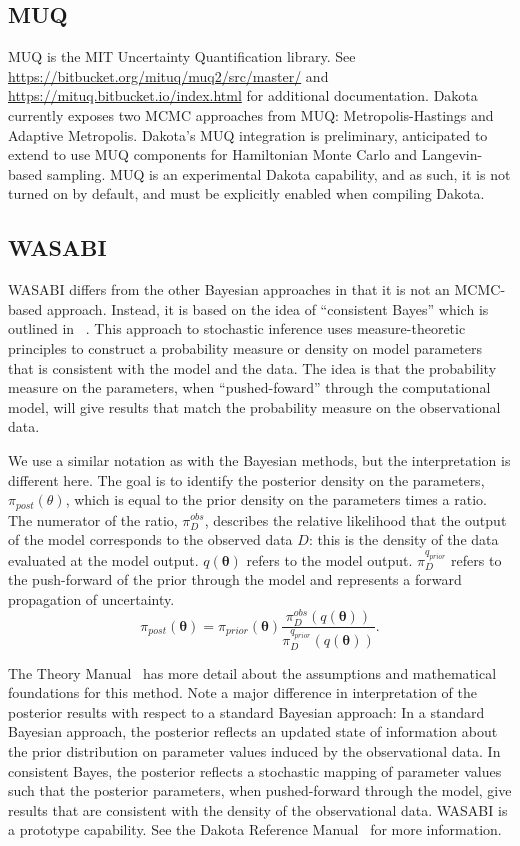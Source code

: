 \subsection{MUQ}
MUQ is the MIT Uncertainty Quantification library.  See
\url{https://bitbucket.org/mituq/muq2/src/master/} and
\url{https://mituq.bitbucket.io/index.html} for additional
documentation.  Dakota currently exposes two MCMC approaches from MUQ:
Metropolis-Hastings and Adaptive Metropolis. Dakota's MUQ integration
is preliminary, anticipated to extend to use MUQ components for
Hamiltonian Monte Carlo and Langevin-based sampling.  MUQ is an
experimental Dakota capability, and as such, it is not turned on by
default, and must be explicitly enabled when compiling Dakota.

\subsection{WASABI}
WASABI differs from the other Bayesian approaches in that it is 
not an MCMC-based approach.  Instead, it is based on the idea of 
``consistent Bayes'' which is outlined in ~\cite{Butler2017}.
This approach to stochastic inference uses measure-theoretic 
principles to construct a probability measure or density on model parameters
that is consistent with the model and the data.  The idea is that
the probability measure on the parameters, when ``pushed-foward'' through
the computational model, will give results that match the probability 
measure on the observational data.  

We use a similar notation as with the Bayesian methods, but the interpretation 
is different here.  The goal is to identify the posterior density on the 
parameters, $\pi_{post}({\theta})$, which is equal to the prior density on the 
parameters times a ratio.  The numerator of the ratio, $\pi_{D}^{obs}$, 
describes the relative likelihood that the output of the model corresponds 
to the observed data ${D}$:  this is the density of the data evaluated at 
the model output.  
$q(\boldsymbol{\theta})$ refers to the model output.  
$\pi_{D}^{q_{prior}}$ refers to the push-forward of the prior through the model 
and represents a forward propagation of uncertainty. 
\begin{equation}
\pi_{post}(\boldsymbol{\theta})=\pi_{prior}(\boldsymbol{\theta})\frac{\pi_{D}^{obs}(q(\boldsymbol{\theta}))}{\pi_{D}^{q_{prior}}(q(\boldsymbol{\theta}))}. 
\label{eq:consistentBayesEq}
\end{equation}

The Theory Manual~\cite{TheoMan} has more detail about the assumptions and mathematical foundations 
for this method.  Note a major difference in interpretation of the posterior results with respect to 
a standard Bayesian approach:  In a standard Bayesian approach, the posterior reflects an updated state 
of information about the prior distribution on parameter values induced by the observational data.  
In consistent Bayes, the posterior reflects a stochastic mapping of parameter values such that the posterior 
parameters, when pushed-forward through the model, give results that are consistent with the density 
of the observational data. 
WASABI is a prototype capability.  See the Dakota Reference
Manual~\cite{RefMan} for more information.

